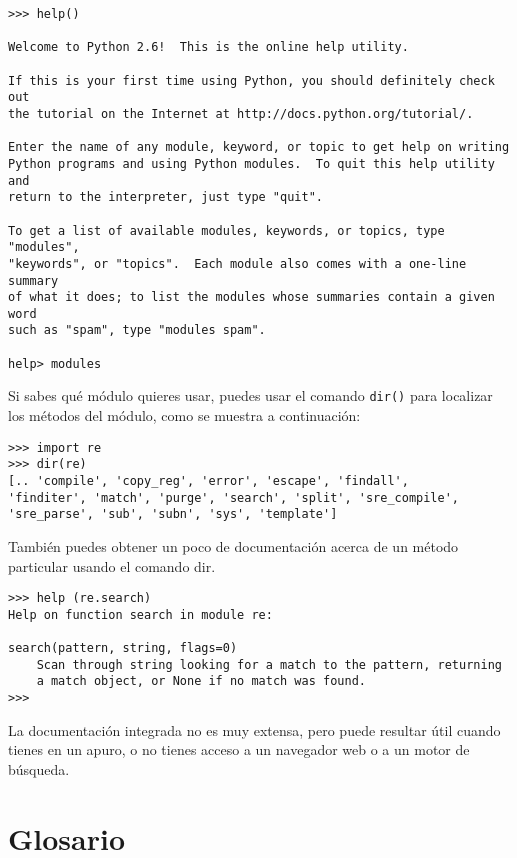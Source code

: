 \beforeverb
\begin{verbatim}
>>> help()

Welcome to Python 2.6!  This is the online help utility.

If this is your first time using Python, you should definitely check out
the tutorial on the Internet at http://docs.python.org/tutorial/.

Enter the name of any module, keyword, or topic to get help on writing
Python programs and using Python modules.  To quit this help utility and
return to the interpreter, just type "quit".

To get a list of available modules, keywords, or topics, type "modules",
"keywords", or "topics".  Each module also comes with a one-line summary
of what it does; to list the modules whose summaries contain a given word
such as "spam", type "modules spam".

help> modules
\end{verbatim}
\afterverb
%
Si sabes qué módulo quieres usar, puedes usar el comando {\tt dir()} para localizar los métodos del módulo, como
se muestra a continuación:

\beforeverb
\begin{verbatim}
>>> import re
>>> dir(re)
[.. 'compile', 'copy_reg', 'error', 'escape', 'findall', 
'finditer', 'match', 'purge', 'search', 'split', 'sre_compile', 
'sre_parse', 'sub', 'subn', 'sys', 'template']
\end{verbatim}
\afterverb
%
También puedes obtener un poco de documentación acerca de un método particular usando el comando dir.

\beforeverb
\begin{verbatim}
>>> help (re.search)
Help on function search in module re:

search(pattern, string, flags=0)
    Scan through string looking for a match to the pattern, returning
    a match object, or None if no match was found.
>>> 
\end{verbatim}
\afterverb
%
La documentación integrada no es muy extensa, pero puede resultar útil cuando tienes en un apuro,
o no tienes acceso a un navegador web o a un motor de búsqueda.

\section{Glosario}

